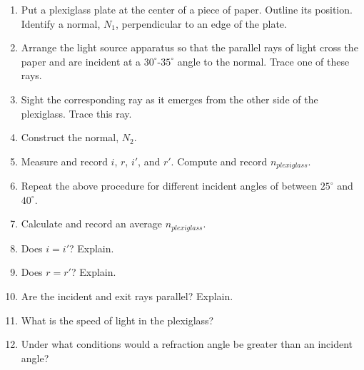 \begin{enumerate}
\item Put a plexiglass plate at the center of a piece of paper. Outline
its position. Identify a normal, $N_1$, perpendicular to an edge of
the plate.
\item Arrange the light source apparatus so that the parallel rays of light
cross the paper and are incident at a $30^\circ$-$35^\circ$ angle
to the normal. Trace one of these rays.
\item Sight the corresponding ray as it emerges from the other side of the
plexiglass. Trace this ray.
\item Construct the normal, $N_2$.
\item Measure and record $i$, $r$, $i'$, and $r'$. Compute and record $n_{plexiglass}$.\vspace{20mm}

\item Repeat the above procedure for different incident angles of between
$25^\circ$ and $40^\circ$.
\item Calculate and record an average $n_{plexiglass}$.\vspace{20mm}

\item Does $i = i'$? Explain.\vspace{15mm}

\item Does $r = r'$? Explain.\vspace{15mm}

\item Are the incident and exit rays parallel? Explain.\vspace{15mm}

\item What is the speed of light in the plexiglass?\vspace{15mm}

\item Under what conditions would a refraction angle be greater than an
incident angle?\vspace{15mm}
\end{enumerate}

